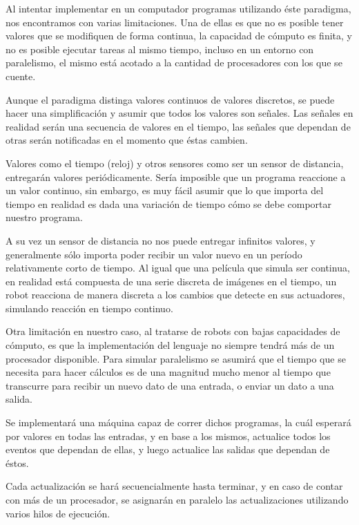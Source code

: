 
  Al intentar implementar en un computador programas utilizando éste
paradigma, nos encontramos con varias limitaciones.
  Una de ellas es que no es posible tener valores que se modifiquen de
forma continua, la capacidad de cómputo es finita, y no es posible
ejecutar tareas al mismo tiempo, incluso en un entorno con
paralelismo, el mismo está acotado a la cantidad de procesadores
con los que se cuente.

  Aunque el paradigma distinga valores continuos de valores
  discretos, se puede hacer una simplificación y asumir que todos
  los valores son señales.
  Las señales en realidad serán una secuencia de valores en el tiempo,
las señales que dependan de otras serán notificadas en el momento
que éstas cambien.

  Valores como el tiempo (reloj) y otros sensores como ser un sensor de
distancia, entregarán valores periódicamente.
  Sería imposible que un programa reaccione a un valor continuo,
sin embargo, es muy fácil asumir que lo que importa del tiempo en realidad
es dada una variación de tiempo cómo se debe comportar nuestro programa.

  A su vez un sensor de distancia no nos puede entregar infinitos valores,
y generalmente sólo importa poder recibir un valor nuevo en un período
relativamente corto de tiempo.
  Al igual que una película que simula ser continua, en realidad está
compuesta de una serie discreta de imágenes en el tiempo, un robot
reacciona de manera discreta a los cambios que detecte en sus actuadores,
simulando reacción en tiempo continuo.

  Otra limitación en nuestro caso, al tratarse de robots con bajas
capacidades de cómputo, es que la implementación del lenguaje no
siempre tendrá más de un procesador disponible.
  Para simular paralelismo se asumirá que el tiempo que se necesita
para hacer cálculos es de una magnitud mucho menor al tiempo que
transcurre para recibir un nuevo dato de una entrada, o enviar un
dato a una salida.

  Se implementará una máquina capaz de correr dichos programas,
la cuál esperará por valores en todas las entradas, y en base a los
mismos, actualice todos los eventos que dependan de ellas,
y luego actualice las salidas que dependan de éstos.

  Cada actualización se hará secuencialmente hasta terminar, y en
caso de contar con más de un procesador, se asignarán en paralelo
las actualizaciones utilizando varios hilos de ejecución.
